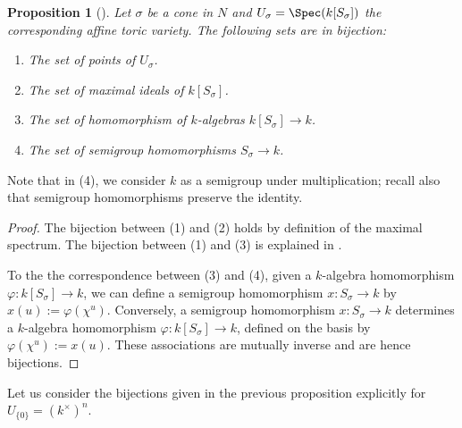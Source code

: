 \documentclass[12pt]{amsart}
\theoremstyle{plain}
\newtheorem{proposition}[theorem]{Proposition}
\begin{document}
\begin{proposition}[{\cite[Proposition 1.3.1]{CLS11}}]
Let $\sigma$ be a cone in $N$ and $U_\sigma = \Spec(k[S_\sigma])$ the corresponding affine toric variety.
The following sets are in bijection:
\begin{enumerate}
\item The set of points of $U_\sigma$.
\item The set of maximal ideals of $k[S_\sigma]$.
\item The set of homomorphism of $k$-algebras $k[S_\sigma] \to k$.
\item The set of semigroup homomorphisms $S_\sigma \to k$.
\end{enumerate}
\end{proposition}

Note that in (4), we consider $k$ as a semigroup under multiplication;
recall also that semigroup homomorphisms preserve the identity.

\begin{proof}
The bijection between (1) and (2) holds by definition of the maximal spectrum.
The bijection between (1) and (3) is explained in \cite[3.28]{Milne13}.

To the the correspondence between (3) and (4), given a $k$-algebra homomorphism $\varphi : k[S_\sigma] \to k$, we can define a semigroup homomorphism $x : S_\sigma \to k$ by $x(u) := \varphi(\chi^u)$.
Conversely, a semigroup homomorphism $x : S_\sigma \to k$ determines a $k$-algebra homomorphism $\varphi : k[S_\sigma] \to k$, defined on the basis by $\varphi(\chi^u) := x(u)$.
These associations are mutually inverse and are hence bijections.
\end{proof}

Let us consider the bijections given in the previous proposition explicitly for $U_{\{0\}} = (k^\times)^n$.
\end{document}
